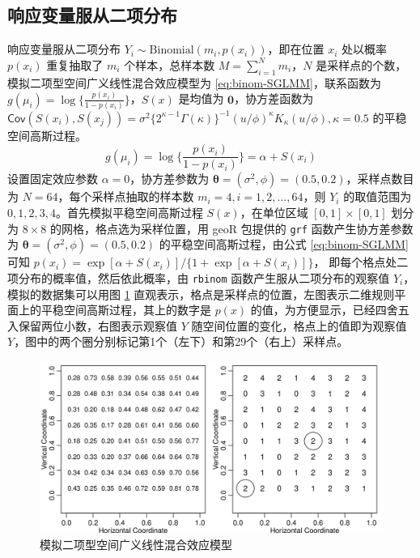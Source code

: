 \documentclass[12pt,a4paper,UTF8,twoside]{book}
\theoremstyle{definition}
\theoremstyle{definition}
\theoremstyle{definition}
\theoremstyle{remark}
\begin{document}
\hypertarget{sim-binomal-sglmm}{%
\subsection{响应变量服从二项分布}\label{sim-binomal-sglmm}}

响应变量服从二项分布 \(Y_{i} \sim \mathrm{Binomial}(m_{i},p(x_{i}))\)，即在位置 \(x_i\) 处以概率 \(p(x_i)\) 重复抽取了 \(m_i\) 个样本，总样本数 \(M=\sum_{i=1}^{N}m_i\)，\(N\) 是采样点的个数，模拟二项型空间广义线性混合效应模型为 \eqref{eq:binom-SGLMM}，联系函数为 \(g(\mu_i) = \log\{\frac{p(x_i)}{1-p(x_i)}\}\)，\(S(x)\) 是均值为 \(\mathbf{0}\)，协方差函数为 \(\mathsf{Cov}(S(x_i),S(x_j)) = \sigma^2 \big\{2^{\kappa-1}\Gamma(\kappa)\big\}^{-1}(u/\phi)^{\kappa}K_{\kappa}(u/\phi), \kappa = 0.5\) 的平稳空间高斯过程。
\begin{equation}
g(\mu_i) = \log\big\{\frac{p(x_i)}{1-p(x_i)}\big\} = \alpha + S(x_i) \label{eq:binom-SGLMM}
\end{equation}
设置固定效应参数 \(\alpha = 0\)，协方差参数为 \(\boldsymbol{\theta} = (\sigma^2, \phi) = (0.5, 0.2)\)，采样点数目为 \(N = 64\)，每个采样点抽取的样本数 \(m_i = 4, i = 1, 2, \ldots, 64\)，则 \(Y_i\) 的取值范围为 \(0, 1, 2, 3, 4\)。首先模拟平稳空间高斯过程 \(S(x)\)，在单位区域 \([0,1] \times [0,1]\) 划分为 \(8 \times 8\) 的网格，格点选为采样位置，用 geoR 包提供的 \texttt{grf} 函数产生协方差参数为 \(\boldsymbol{\theta} = (\sigma^2,\phi) = (0.5, 0.2)\) 的平稳空间高斯过程，由公式 \eqref{eq:binom-SGLMM} 可知 \(p(x_i) = \exp[\alpha + S(x_i)]/\{1 + \exp[\alpha + S(x_i)]\}\)， 即每个格点处二项分布的概率值，然后依此概率，由 \texttt{rbinom} 函数产生服从二项分布的观察值 \(Y_i\)，模拟的数据集可以用图 \ref{fig:binom-without-nugget-geoRglm} 直观表示，格点是采样点的位置，左图表示二维规则平面上的平稳空间高斯过程，其上的数字是 \(p(x)\) 的值，为方便显示，已经四舍五入保留两位小数，右图表示观察值 \(Y\) 随空间位置的变化，格点上的值即为观察值 \(Y\)，图中的两个圈分别标记第1个（左下）和第29个（右上）采样点。

\begin{figure}

{\centering \includegraphics[width=0.9\linewidth]{figures/binom-without-nugget-geoRglm} 

}

\caption{模拟二项型空间广义线性混合效应模型}\label{fig:binom-without-nugget-geoRglm}
\end{figure}
\end{document}
